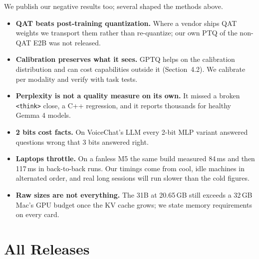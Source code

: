 \documentclass[10pt,letterpaper]{article}
\begin{document}
We publish our negative results too; several shaped the methods above.
\begin{itemize}
  \item \textbf{QAT beats post-training quantization.} Where a vendor ships QAT weights we transport them rather than re-quantize; our own PTQ of the non-QAT E2B was not released.
  \item \textbf{Calibration preserves what it sees.} GPTQ helps on the calibration distribution and can cost capabilities outside it (Section~4.2). We calibrate per modality and verify with task tests.
  \item \textbf{Perplexity is not a quality measure on its own.} It missed a broken \texttt{<think>} close, a C++ regression, and it reports thousands for healthy Gemma 4 models.
  \item \textbf{2 bits cost facts.} On VoiceChat's LLM every 2-bit MLP variant answered questions wrong that 3 bits answered right.
  \item \textbf{Laptops throttle.} On a fanless M5 the same build measured 84\,ms and then 117\,ms in back-to-back runs. Our timings come from cool, idle machines in alternated order, and real long sessions will run slower than the cold figures.
  \item \textbf{Raw sizes are not everything.} The 31B at 20.65\,GB still exceeds a 32\,GB Mac's GPU budget once the KV cache grows; we state memory requirements on every card.
\end{itemize}

\clearpage
\appendix
\section{All Releases}
\end{document}
